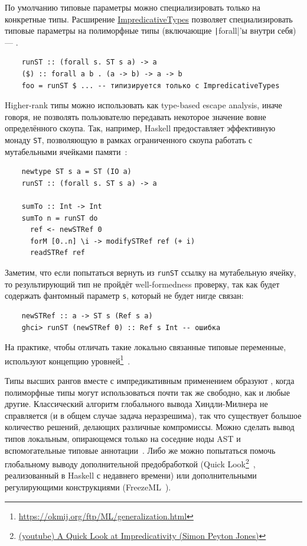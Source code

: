 По умолчанию типовые параметры можно специализировать только на конкретные типы.
Расширение \href{https://downloads.haskell.org/ghc/latest/docs/users_guide/exts/impredicative_types.html}{ImpredicativeTypes} позволяет специализировать типовые параметры на полиморфные типы (включающие \texttt|forall|'ы внутри себя) --- .
\begin{verbatim}
    runST :: (forall s. ST s a) -> a
    ($) :: forall a b . (a -> b) -> a -> b
    foo = runST $ ... -- типизируется только с ImpredicativeTypes
\end{verbatim}

Higher-rank типы можно использовать как type-based escape analysis, иначе говоря, не позволять пользователю передавать некоторое значение вовне определённого скоупа.
Так, например, Haskell предоставляет эффективную монаду \texttt{ST}, позволяющую в рамках ограниченного скоупа работать с мутабельными ячейками памяти~\cite{launchbury1995state}\cite[7.2, ST trick]{maguire-types}:
\begin{verbatim}
    newtype ST s a = ST (IO a)
    runST :: (forall s. ST s a) -> a

    sumTo :: Int -> Int
    sumTo n = runST do
      ref <- newSTRef 0
      forM [0..n] \i -> modifySTRef ref (+ i)
      readSTRef ref
\end{verbatim}
Заметим, что если попытаться вернуть из \texttt{runST} ссылку на мутабельную ячейку, то результирующий тип не пройдёт well-formedness проверку, так как будет содержать фантомный параметр \texttt{s}, который не будет нигде связан:
\begin{verbatim}
    newSTRef :: a -> ST s (Ref s a)
    ghci> runST (newSTRef 0) :: Ref s Int -- ошибка
\end{verbatim}
На практике, чтобы отличать такие локально связанные типовые переменные, используют концепцию уровней\footnote{\url{https://okmij.org/ftp/ML/generalization.html}}~\cite{peytonjones2019typeinference}.

Типы высших рангов вместе с импредикативным применением образуют , когда полиморфные типы могут использоваться почти так же свободно, как и любые другие.
Классический алгоритм глобального вывода Хиндли-Милнера не справляется (и в общем случае задача неразрешима), так что существует большое количество решений, делающих различные компромиссы.
Можно сделать вывод типов локальным, опирающемся только на соседние ноды AST и вспомогательные типовые аннотации~\cite{pierce2000local, christiansen2013bidirectional, dunfield2019sound}.
Либо же можно попытаться помочь глобальному выводу дополнительной предобработкой (Quick Look\footnote{\href{https://youtu.be/ZuNMo136QqI?si=qp8PAEeeF-bioCB_}{(youtube) A Quick Look at Impredicativity (Simon Peyton Jones)}}~\cite{serrano2020quick}, реализованный в Haskell с недавнего времени) или дополнительными регулирующими конструкциями (FreezeML~\cite{emrich2020freezeml}).

